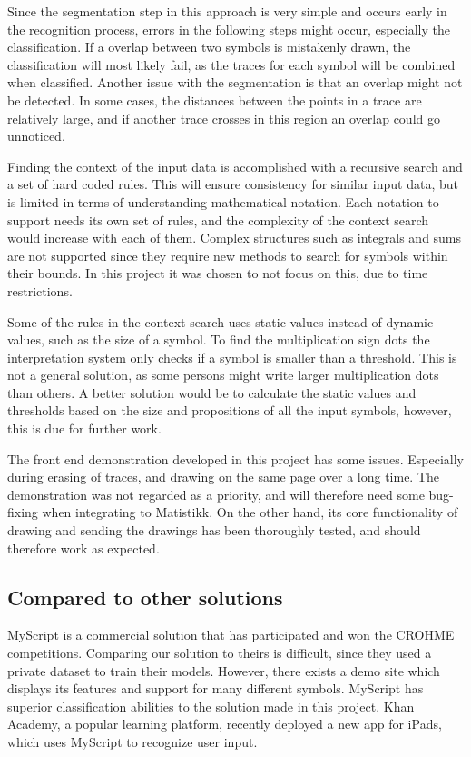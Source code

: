 Since the segmentation step in this approach is very simple and occurs early in the recognition process, errors in the following steps might occur, especially the classification. If a overlap between two symbols is mistakenly drawn, the classification will most likely fail, as the traces for each symbol will be combined when classified. Another issue with the segmentation is that an overlap might not be detected. In some cases, the distances between the points in a trace are relatively large, and if another trace crosses in this region an overlap could go unnoticed.

Finding the context of the input data is accomplished with a recursive search and a set of hard coded rules. This will ensure consistency for similar input data, but is limited in terms of understanding mathematical notation. Each notation to support needs its own set of rules, and the complexity of the context search would increase with each of them. Complex structures such as integrals and sums are not supported since they require new methods to search for symbols within their bounds. In this project it was chosen to not focus on this, due to time restrictions.

Some of the rules in the context search uses static values instead of dynamic values, such as the size of a symbol. To find the multiplication sign dots the interpretation system only checks if a symbol is smaller than a threshold. This is not a general solution, as some persons might write larger multiplication dots than others. A better solution would be to calculate the static values and thresholds based on the size and propositions of all the input symbols, however, this is due for further work.

The front end demonstration developed in this project has some issues. Especially during erasing of traces, and drawing on the same page over a long time. The demonstration was not regarded as a priority, and will therefore need some bug-fixing when integrating to Matistikk. On the other hand, its core functionality of drawing and sending the drawings has been thoroughly tested, and should therefore work as expected.

\subsection{Compared to other solutions}

MyScript is a commercial solution that has participated and won the CROHME competitions. Comparing our solution to theirs is difficult, since they used a private dataset to train their models. However, there exists a demo site which displays its features and support for many different symbols. MyScript has superior classification abilities to the solution made in this project. Khan Academy, a popular learning platform, recently deployed a new app for iPads, which uses MyScript to recognize user input.

